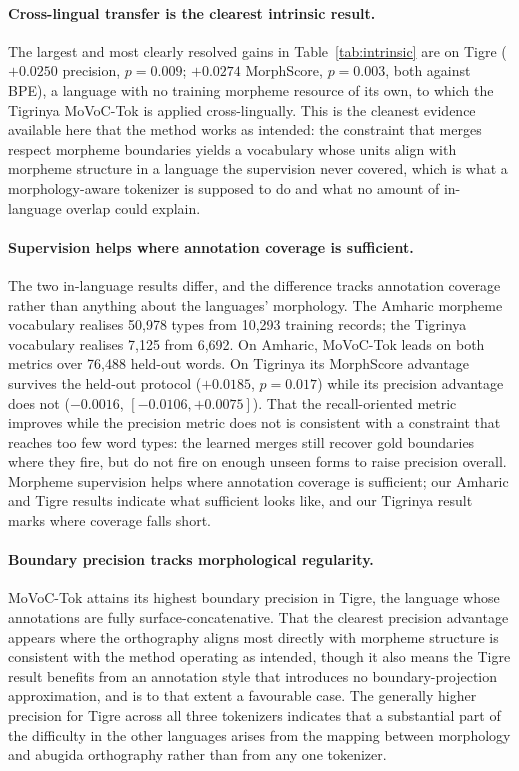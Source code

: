 \documentclass[11pt]{article}
\begin{document}
\paragraph{Cross-lingual transfer is the clearest intrinsic result.}
The largest and most clearly resolved gains in Table~\ref{tab:intrinsic} are on
Tigre ($+0.0250$ precision, $p = 0.009$; $+0.0274$ MorphScore, $p = 0.003$,
both against BPE), a language with no training morpheme resource of its own, to
which the Tigrinya MoVoC-Tok is applied cross-lingually. This is the cleanest
evidence available here that the method works as intended: the constraint that
merges respect morpheme boundaries yields a vocabulary whose units align with
morpheme structure in a language the supervision never covered, which is what a
morphology-aware tokenizer is supposed to do and what no amount of in-language
overlap could explain.

\paragraph{Supervision helps where annotation coverage is sufficient.}
The two in-language results differ, and the difference tracks annotation
coverage rather than anything about the languages' morphology. The Amharic
morpheme vocabulary realises 50,978 types from 10,293 training records; the
Tigrinya vocabulary realises 7,125 from 6,692. On Amharic, MoVoC-Tok leads on
both metrics over 76,488 held-out words. On Tigrinya its MorphScore advantage
survives the held-out protocol ($+0.0185$, $p = 0.017$) while its precision
advantage does not ($-0.0016$, $[-0.0106, +0.0075]$). That the recall-oriented
metric improves while the precision metric does not is consistent with a
constraint that reaches too few word types: the learned merges still recover
gold boundaries where they fire, but do not fire on enough unseen forms to
raise precision overall. Morpheme supervision helps where annotation coverage
is sufficient; our Amharic and Tigre results indicate what sufficient looks
like, and our Tigrinya result marks where coverage falls short.

\paragraph{Boundary precision tracks morphological regularity.}
MoVoC-Tok attains its highest boundary precision in Tigre, the language whose
annotations are fully surface-concatenative. That the clearest precision
advantage appears where the orthography aligns most directly with morpheme
structure is consistent with the method operating as intended, though it also
means the Tigre result benefits from an annotation style that introduces no
boundary-projection approximation, and is to that extent a favourable case. The
generally
higher precision for Tigre across all three tokenizers indicates that a
substantial part of the difficulty in the other languages arises from the
mapping between morphology and abugida orthography rather than from any one
tokenizer.
\end{document}
